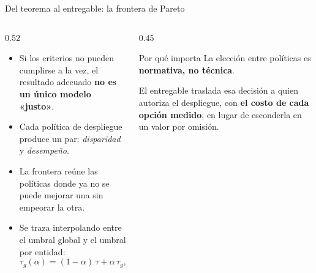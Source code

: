 \documentclass[aspectratio=169,11pt]{beamer}
\newcommand{\resalta}[1]{{\color{vino}\bfseries #1}}
\begin{document}
\begin{frame}{Del teorema al entregable: la frontera de Pareto}
  \vspace{0.5em}
  \begin{columns}[T,onlytextwidth]
    \begin{column}{0.52\textwidth}
      \vspace{0.3em}
      \begin{itemize}\small\setlength\itemsep{0.45em}
        \item Si los criterios no pueden cumplirse a la vez, el resultado
              adecuado \resalta{no es un único modelo «justo»}.
        \item Cada política de despliegue produce un par:
              \textit{disparidad} y \textit{desempeño}.
        \item La frontera reúne las políticas donde ya no se puede mejorar una
              sin empeorar la otra.
        \item Se traza interpolando entre el umbral global y el umbral por
              entidad:
              \[\tau_g(\alpha)=(1-\alpha)\,\tau+\alpha\,\tau_g,\quad
                \alpha\in[0,1]\]
      \end{itemize}
    \end{column}
    \begin{column}{0.45\textwidth}
      \vspace{0.6em}
      \begin{block}{Por qué importa}
        La elección entre políticas es \resalta{normativa, no técnica}.

        \vspace{0.5em}
        El entregable traslada esa decisión a quien autoriza el despliegue,
        con \resalta{el costo de cada opción medido}, en lugar de esconderla en
        un valor por omisión.
      \end{block}
    \end{column}
  \end{columns}
\end{frame}
\end{document}
